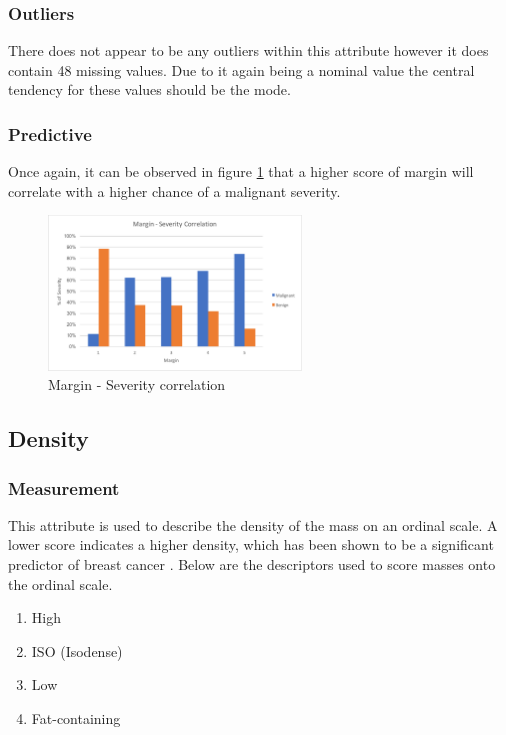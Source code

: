 \documentclass[12pt]{article}
\begin{document}
      \subsubsection{Outliers}
        There does not appear to be any outliers within this attribute however it does contain 48 missing values. Due to it again being a nominal value the central tendency for these values should be the mode.

      \subsubsection{Predictive}
        Once again, it can be observed in figure \ref{fig:margin-severity-correlation} that a higher score of margin will correlate with a higher chance of a malignant severity.

        \begin{figure}[H]
          \centering
          \includegraphics[width=0.6\textwidth]{margin-severity-correlation}
          \caption{Margin - Severity correlation}
          \label{fig:margin-severity-correlation}
        \end{figure}

    \subsection{Density}
      \subsubsection{Measurement}
        This attribute is used to describe the density of the mass on an ordinal scale. A lower score indicates a higher density, which has been shown to be a significant predictor of breast cancer \citep{woods2011mammographic}. Below are the descriptors used to score masses onto the ordinal scale.

        \begin{enumerate}[label=\arabic*)]
          \item High
          \item ISO (Isodense)
          \item Low
          \item Fat-containing
        \end{enumerate}
\end{document}
